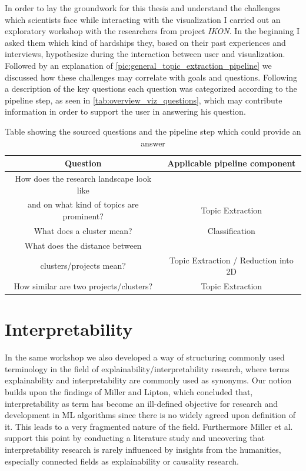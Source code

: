 In order to lay the groundwork for this thesis and understand the challenges which scientists face while interacting with the visualization I carried out an exploratory workshop with the researchers from project \textit{IKON}. In the beginning I asked them which kind of hardships they, based on their past experiences and interviews, hypothesize during the interaction between user and visualization. Followed by an explanation of \autoref{pic:general_topic_extraction_pipeline} we discussed how these challenges may correlate with goals and questions. Following a description of the key questions each question was categorized according to the pipeline step, as seen in \autoref{tab:overview_viz_questions}, which may contribute information in order to support the user in answering his question.

\begin{table}
	\centering
	\begin{tabular}{ c | c }
		\hline 
		Question & Applicable pipeline component \\ \hline
		How does the research landscape look like \\ and on what kind of topics are prominent? & Topic Extraction \\ \hline
		What does a cluster mean? & Classification \\ \hline
		What does the distance between \\ clusters/projects mean? & Topic Extraction / Reduction into 2D \\ \hline
		How similar are two projects/clusters? & Topic Extraction \\
		\hline
	\end{tabular}
	\caption{\label{tab:overview_viz_questions} Table showing the sourced questions and the pipeline step which could provide an answer}
\end{table} 

\section{Interpretability}

In the same workshop we also developed a way of structuring commonly used terminology in the field of explainability/interpretability research, where terms explainability and interpretability are commonly used as synonyms. Our notion builds upon the findings of Miller and Lipton, which concluded that, interpretability as term has become an ill-defined objective \cite{liptonMythosModelInterpretability2016a} for research and development in ML algorithms since there is no widely agreed upon definition of it. This leads to a very fragmented nature of the field. Furthermore Miller et al. \cite{millerExplainableAIBeware2017} support this point by conducting a literature study and uncovering that interpretability research is rarely influenced by insights from the humanities, especially connected fields as explainability or causality research.

